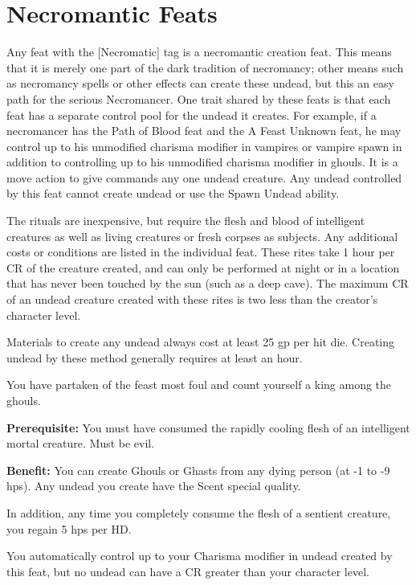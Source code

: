 \section{Necromantic Feats}

Any feat with the [Necromatic] tag is a necromantic creation feat. This means that it is merely one part of the dark tradition of necromancy; other means such as necromancy spells or other effects can create these undead, but this an easy path for the serious Necromancer. One trait shared by these feats is that each feat has a separate control pool for the undead it creates. For example, if a necromancer has the Path of Blood feat and the A Feast Unknown feat, he may control up to his unmodified charisma modifier in vampires or vampire spawn in addition to controlling up to his unmodified charisma modifier in ghouls. It is a move action to give commands any one undead creature. Any undead controlled by this feat cannot create undead or use the Spawn Undead ability.

The rituals are inexpensive, but require the flesh and blood of intelligent creatures as well as living creatures or fresh corpses as subjects. Any additional costs or conditions are listed in the individual feat. These rites take 1 hour per CR of the creature created, and can only be performed at night or in a location that has never been touched by the sun (such as a deep cave). The maximum CR of an undead creature created with these rites is two less than the creator's character level.

Materials to create any undead always cost at least 25 gp per hit die. Creating undead by these method generally requires at least an hour.


You have partaken of the feast most foul and count yourself a king among the ghouls.

\textbf{Prerequisite:} You must have consumed the rapidly cooling flesh of an intelligent mortal creature. Must be evil.

\textbf{Benefit:} You can create Ghouls or Ghasts from any dying person (at -1 to -9 hps). Any undead you create have the Scent special quality.

In addition, any time you completely consume the flesh of a sentient creature, you regain 5 hps per HD.

You automatically control up to your Charisma modifier in undead created by this feat, but no undead can have a CR greater than your character level.

